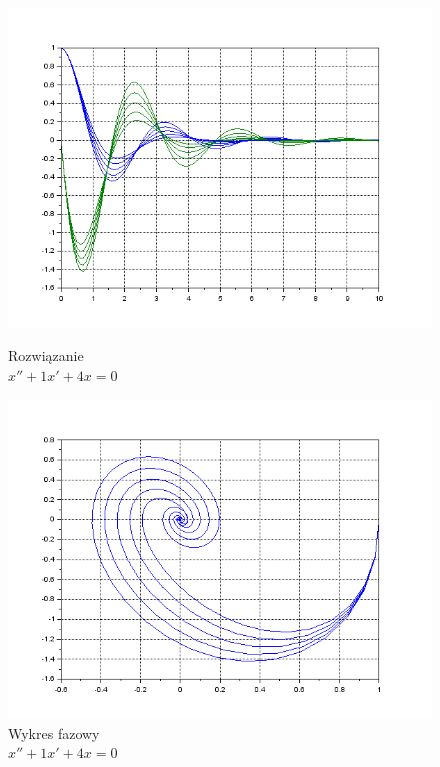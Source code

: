 \documentclass[12pt]{article}
\begin{document}
\begin{figure}[H]
  \centering
  \hspace{-1.6cm}
  \begin{minipage}[b]{0.49\textwidth}
    \includegraphics[scale=0.47]{./img/5-zespolone-xy}
    \caption{Rozwiązanie \\ \centering$x''+1x'+4x=0$}
    \label{5-zespolone-xy}
  \end{minipage}
  \hfill
  \begin{minipage}[b]{0.49\textwidth}
    \includegraphics[scale=0.47]{./img/5-zespolone-phase}
    \caption{Wykres fazowy \\ \centering $x''+1x'+4x=0$}
    \label{5-zespolone-phase}
  \end{minipage}
\end{figure}
\end{document}
